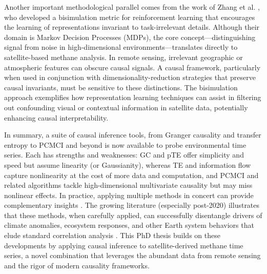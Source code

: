 Another important methodological parallel comes from the work of Zhang et al. \cite{zhang_learning_2021}, who developed a bisimulation metric for reinforcement learning that encourages the learning of representations invariant to task-irrelevant details. Although their domain is Markov Decision Processes (MDPs), the core concept—distinguishing signal from noise in high-dimensional environments—translates directly to satellite-based methane analysis. In remote sensing, irrelevant geographic or atmospheric features can obscure causal signals. A causal framework, particularly when used in conjunction with dimensionality-reduction strategies that preserve causal invariants, must be sensitive to these distinctions. The bisimulation approach exemplifies how representation learning techniques can assist in filtering out confounding visual or contextual information in satellite data, potentially enhancing causal interpretability.

In summary, a suite of causal inference tools, from Granger causality and transfer entropy to PCMCI and beyond is now available to probe environmental time series. Each has strengths and weaknesses: GC and pTE offer simplicity and speed but assume linearity (or Gaussianity), whereas TE and information flow capture nonlinearity at the cost of more data and computation, and PCMCI and related algorithms tackle high-dimensional multivariate causality but may miss nonlinear effects. In practice, applying multiple methods in concert can provide complementary insights \cite{Docquier2024, silini_assessing_2023}. The growing literature (especially post-2020) illustrates that these methods, when carefully applied, can successfully disentangle drivers of climate anomalies, ecosystem responses, and other Earth system behaviors that elude standard correlation analysis \cite{Runge2019}. This PhD thesis builds on these developments by applying causal inference to satellite-derived methane time series, a novel combination that leverages the abundant data from remote sensing and the rigor of modern causality frameworks.

